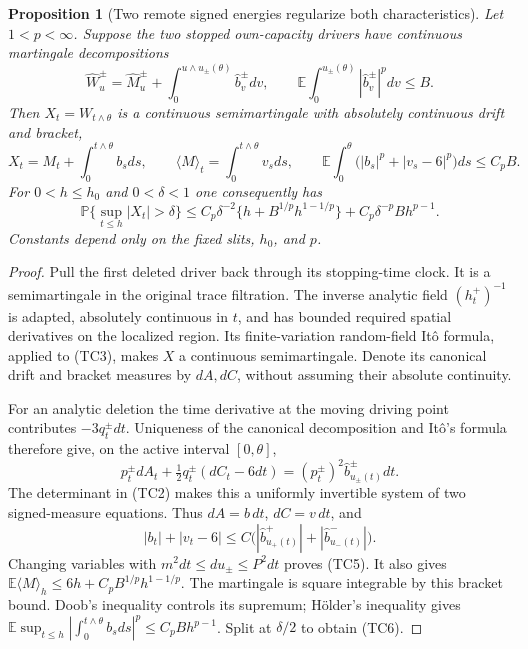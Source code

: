 \documentclass[11pt]{article}
\newtheorem{proposition}[theorem]{Proposition}
\theoremstyle{definition}\newtheorem{definition}[theorem]{Definition}
\theoremstyle{remark}\newtheorem{remark}[theorem]{Remark}
\begin{document}
\begin{proposition}[Two remote signed energies regularize both characteristics]
\label{prop:two-slit-characteristic-control}
Let $1<p<\infty$. Suppose the two stopped own-capacity drivers have
continuous martingale decompositions
\[
 \widehat W^\pm_u=\widehat M^\pm_u+
    \int_0^{u\wedge u_\pm(\theta)}\widehat b^\pm_vdv,
 \qquad
 \mathbb E\int_0^{u_\pm(\theta)}|\widehat b^\pm_v|^pdv\le B.
 \tag{TC4}
\]
Then $X_t=W_{t\wedge\theta}$ is a continuous semimartingale with
absolutely continuous drift and bracket,
\[
 X_t=M_t+\int_0^{t\wedge\theta}b_sds,\qquad
 \langle M\rangle_t=\int_0^{t\wedge\theta}v_sds,\qquad
 \mathbb E\int_0^\theta\bigl(|b_s|^p+|v_s-6|^p\bigr)ds\le C_pB.
 \tag{TC5}
\]
For $0<h\le h_0$ and $0<\delta<1$ one consequently has
\[
 \mathbb P\{\sup_{t\le h}|X_t|>\delta\}
 \le C_p\delta^{-2}\{h+B^{1/p}h^{1-1/p}\}
          +C_p\delta^{-p}Bh^{p-1}.
 \tag{TC6}
\]
Constants depend only on the fixed slits, $h_0$, and $p$.
\end{proposition}
\begin{proof}
Pull the first deleted driver back through its stopping-time clock.
It is a semimartingale in the original trace filtration. The inverse
analytic field $(h_t^+)^{-1}$ is adapted, absolutely continuous in
$t$, and has bounded required spatial derivatives on the localized
region. Its finite-variation random-field It\^o formula, applied to
(TC3), makes $X$ a continuous semimartingale. Denote its canonical
drift and bracket measures by $dA,dC$, without assuming their
absolute continuity.

For an analytic deletion the time derivative at the moving driving
point contributes $-3q_t^\pm dt$. Uniqueness of the canonical
decomposition and It\^o's formula therefore give, on the active
interval $[0,\theta]$,
\[
 p_t^\pm dA_t+\tfrac12q_t^\pm(dC_t-6dt)
       =(p_t^\pm)^2\widehat b^\pm_{u_\pm(t)}dt.
 \tag{TC7}
\]
The determinant in (TC2) makes this a uniformly invertible system
of two signed-measure equations. Thus $dA=b\,dt$, $dC=v\,dt$, and
\[
 |b_t|+|v_t-6|\le C\bigl(
       |\widehat b^+_{u_+(t)}|+|\widehat b^-_{u_-(t)}|\bigr).
\]
Changing variables with $m^2dt\le du_\pm\le P^2dt$ proves (TC5).
It also gives
$\mathbb E\langle M\rangle_h\le6h+C_pB^{1/p}h^{1-1/p}$.
The martingale is square integrable by this bracket bound. Doob's
inequality controls its supremum; H\"older's inequality gives
$\mathbb E\sup_{t\le h}|\int_0^{t\wedge\theta}b_sds|^p
\le C_pBh^{p-1}$. Split at $\delta/2$ to obtain (TC6).
\end{proof}
\end{document}
